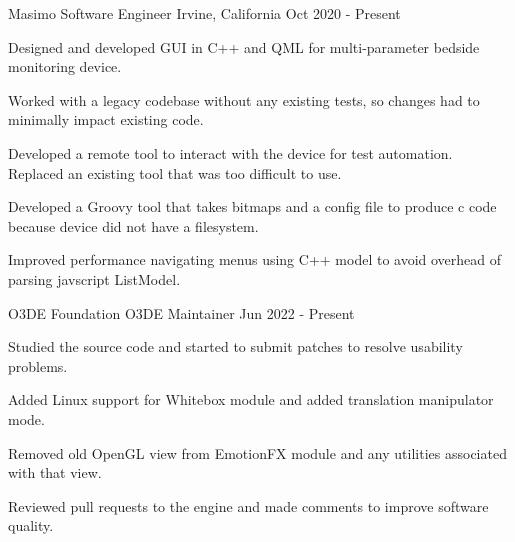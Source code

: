 

\begin{cventries}

\cventry
{Masimo} %
{Software Engineer} %
{Irvine, California} %
{Oct 2020 - Present} %
{
  \begin{cvitems} %
      \item{Designed and developed GUI in C++ and QML for multi-parameter bedside monitoring device.}
      \item{Worked with a legacy codebase without any existing tests, so changes had to minimally impact existing code.}
      \item{Developed a remote tool to interact with the device for test automation. Replaced an existing tool that was too difficult to use. }
      \item{Developed a Groovy tool that takes bitmaps and a config file to produce c code because device did not have a filesystem.}
      \item{Improved performance navigating menus using C++ model to avoid overhead of parsing javscript ListModel.}
  \end{cvitems}
}

  \cventry
  {O3DE Foundation} %
  {O3DE Maintainer} %
  {} %
  {Jun 2022 - Present} %
  {
    \begin{cvitems} %
      \item{Studied the source code and started to submit patches to resolve usability problems.}
      \item{Added Linux support for Whitebox module and added translation manipulator mode.}
      \item{Removed old OpenGL view from EmotionFX module and any utilities associated with that view.}
      \item{Reviewed pull requests to the engine and made comments to improve software quality.}
    \end{cvitems}
  }


\end{cventries}
